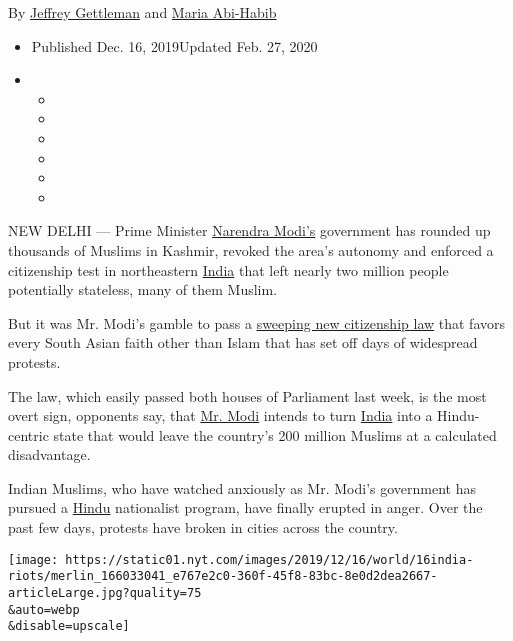 By \href{https://www.nytimes.com/by/jeffrey-gettleman}{Jeffrey
Gettleman} and \href{https://www.nytimes.com/by/maria-abi-habib}{Maria
Abi-Habib}

\begin{itemize}
\item
  Published Dec. 16, 2019Updated Feb. 27, 2020
\item
  \begin{itemize}
  \item
  \item
  \item
  \item
  \item
  \item
  \end{itemize}
\end{itemize}

NEW DELHI --- Prime Minister
\href{https://www.nytimes.com/2019/12/17/world/asia/india-protests-citizenship-muslims.html}{Narendra
Modi's} government has rounded up thousands of Muslims in Kashmir,
revoked the area's autonomy and enforced a citizenship test in
northeastern
\href{https://www.nytimes.com/2019/12/17/world/asia/india-protests-citizenship-muslims.html}{India}
that left nearly two million people potentially stateless, many of them
Muslim.

But it was Mr. Modi's gamble to pass a
\href{https://www.nytimes.com/2019/12/11/world/asia/india-muslims-citizenship-narendra-modi.html}{sweeping
new citizenship law} that favors every South Asian faith other than
Islam that has set off days of widespread protests.

The law, which easily passed both houses of Parliament last week, is the
most overt sign, opponents say, that
\href{https://www.nytimes.com/2019/12/17/world/asia/india-protests-citizenship-muslims.html}{Mr.
Modi} intends to turn
\href{https://www.nytimes.com/2019/12/17/world/asia/india-protests-citizenship-muslims.html}{India}
into a Hindu-centric state that would leave the country's 200 million
Muslims at a calculated disadvantage.

Indian Muslims, who have watched anxiously as Mr. Modi's government has
pursued a
\href{https://www.nytimes.com/2019/12/17/world/asia/india-protests-citizenship-muslims.html}{Hindu}
nationalist program, have finally erupted in anger. Over the past few
days, protests have broken in cities across the country.

\texttt{[image: https://static01.nyt.com/images/2019/12/16/world/16india-riots/merlin\_166033041\_e767e2c0-360f-45f8-83bc-8e0d2dea2667-articleLarge.jpg?quality=75\\\&auto=webp\\\&disable=upscale]}

